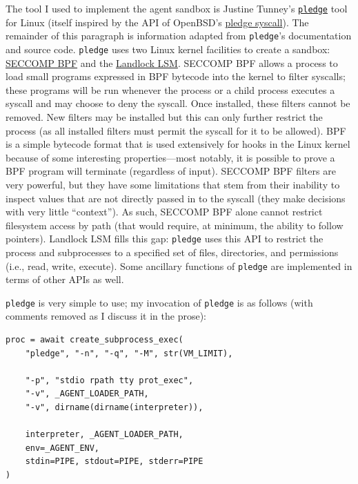 \documentclass[12pt]{article}
\begin{document}
The tool I used to implement the agent sandbox is Justine Tunney's \href{https://justine.lol/pledge/}{\texttt{pledge}} tool for Linux (itself inspired by the API of OpenBSD's \href{https://man.openbsd.org/pledge.2}{pledge syscall}). The remainder of this paragraph is information adapted from \texttt{pledge}'s documentation and source code. \texttt{pledge} uses two Linux kernel facilities to create a sandbox: \href{https://www.kernel.org/doc/html/v4.17/userspace-api/seccomp_filter.html}{SECCOMP BPF} and the \href{https://docs.kernel.org/security/landlock.html}{Landlock LSM}. SECCOMP BPF allows a process to load small programs expressed in BPF bytecode into the kernel to filter syscalls; these programs will be run whenever the process or a child process executes a syscall and may choose to deny the syscall. Once installed, these filters cannot be removed. New filters may be installed but this can only further restrict the process (as all installed filters must permit the syscall for it to be allowed). BPF is a simple bytecode format that is used extensively for hooks in the Linux kernel because of some interesting properties---most notably, it is possible to prove a BPF program will terminate (regardless of input). SECCOMP BPF filters are very powerful, but they have some limitations that stem from their inability to inspect values that are not directly passed in to the syscall (they make decisions with very little ``context''). As such, SECCOMP BPF alone cannot restrict filesystem access by path (that would require, at minimum, the ability to follow pointers). Landlock LSM fills this gap: \texttt{pledge} uses this API to restrict the process and subprocesses to a specified set of files, directories, and permissions (i.e., read, write, execute). Some ancillary functions of \texttt{pledge} are implemented in terms of other APIs as well.

\texttt{pledge} is very simple to use; my invocation of \texttt{pledge} is as follows (with comments removed as I discuss it in the prose):

\begin{verbatim}
proc = await create_subprocess_exec(
    "pledge", "-n", "-q", "-M", str(VM_LIMIT),
    
    "-p", "stdio rpath tty prot_exec",
    "-v", _AGENT_LOADER_PATH,
    "-v", dirname(dirname(interpreter)),
    
    interpreter, _AGENT_LOADER_PATH,
    env=_AGENT_ENV,
    stdin=PIPE, stdout=PIPE, stderr=PIPE
)
\end{verbatim}
\end{document}
